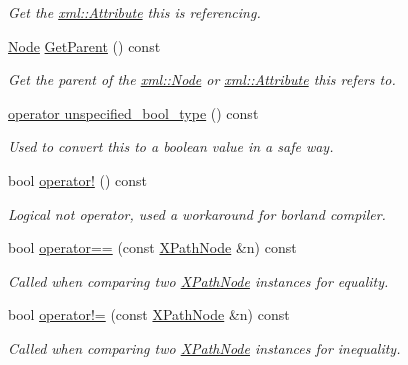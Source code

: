 \begin{DoxyCompactItemize}
\begin{DoxyCompactList}\small\item\em Get the \hyperlink{classphys_1_1xml_1_1Attribute}{xml::Attribute} this is referencing. \item\end{DoxyCompactList}\item 
\hyperlink{classphys_1_1xml_1_1Node}{Node} \hyperlink{classphys_1_1xml_1_1XPathNode_a10d6dce64d14cf3d39bb952efd4ca8aa}{GetParent} () const 
\begin{DoxyCompactList}\small\item\em Get the parent of the \hyperlink{classphys_1_1xml_1_1Node}{xml::Node} or \hyperlink{classphys_1_1xml_1_1Attribute}{xml::Attribute} this refers to. \item\end{DoxyCompactList}\item 
\hyperlink{classphys_1_1xml_1_1XPathNode_a0d11818941c2e31671c5d0cd8f1ce9f9}{operator unspecified\_\-bool\_\-type} () const 
\begin{DoxyCompactList}\small\item\em Used to convert this to a boolean value in a safe way. \item\end{DoxyCompactList}\item 
bool \hyperlink{classphys_1_1xml_1_1XPathNode_a3c596b9cacb6265df6acffb91b9a7484}{operator!} () const 
\begin{DoxyCompactList}\small\item\em Logical not operator, used a workaround for borland compiler. \item\end{DoxyCompactList}\item 
bool \hyperlink{classphys_1_1xml_1_1XPathNode_ab13702ded8707602871596e4f34e8302}{operator==} (const \hyperlink{classphys_1_1xml_1_1XPathNode}{XPathNode} \&n) const 
\begin{DoxyCompactList}\small\item\em Called when comparing two \hyperlink{classphys_1_1xml_1_1XPathNode}{XPathNode} instances for equality. \item\end{DoxyCompactList}\item 
bool \hyperlink{classphys_1_1xml_1_1XPathNode_a121ba0e04b6619f45c5392374f2dc98d}{operator!=} (const \hyperlink{classphys_1_1xml_1_1XPathNode}{XPathNode} \&n) const 
\begin{DoxyCompactList}\small\item\em Called when comparing two \hyperlink{classphys_1_1xml_1_1XPathNode}{XPathNode} instances for inequality. \item\end{DoxyCompactList}\end{DoxyCompactItemize}


